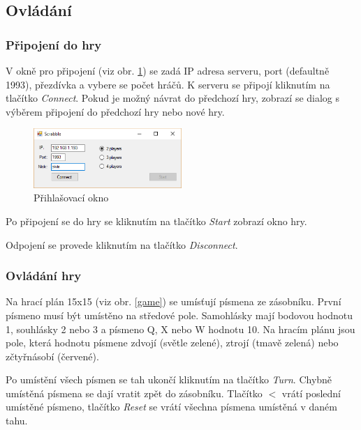 \subsection{Ovládání}
\subsubsection{Připojení do hry}
V okně pro připojení (viz obr. \ref{main}) se zadá IP adresa serveru, port (defaultně 1993), přezdívka a vybere se počet hráčů. K serveru se připojí kliknutím na tlačítko \emph{Connect}. Pokud je možný návrat do předchozí hry, zobrazí se dialog s výběrem připojení do předchozí hry nebo nové hry.

\begin{figure}[H]
	\centering
	\includegraphics[width=0.5\textwidth]{img/main.eps}
	\caption{Přihlašovací okno}
  \label{main}
\end{figure}

Po připojení se do hry se kliknutím na tlačítko \emph{Start} zobrazí okno hry.

Odpojení se provede kliknutím na tlačítko \emph{Disconnect}.

\subsubsection{Ovládání hry}
Na hrací plán 15x15 (viz obr. \ref{game}) se umísťují písmena ze zásobníku. První písmeno musí být umístěno na středové pole. Samohlásky mají bodovou hodnotu 1, souhlásky 2 nebo 3 a písmeno Q, X nebo W hodnotu 10. Na hracím plánu jsou pole, která hodnotu písmene zdvojí (světle zelené), ztrojí (tmavě zelená) nebo zčtyřnásobí (červené). 

Po umístění všech písmen se tah ukončí kliknutím na tlačítko \emph{Turn}. Chybně umístěná písmena se dají vratit zpět do zásobníku. Tlačítko \emph{$<$} vrátí poslední umístěné písmeno, tlačítko \emph{Reset} se vrátí všechna písmena umístěná v daném tahu.

